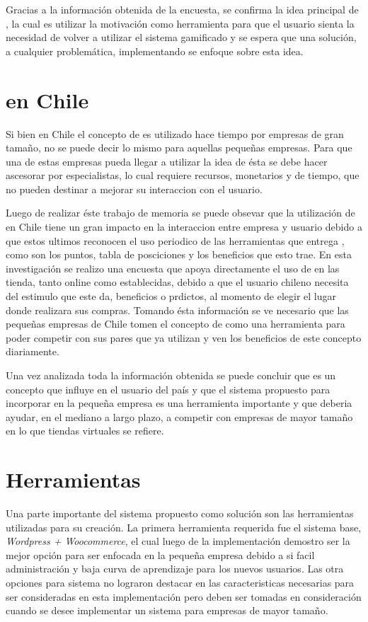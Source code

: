 Gracias a la información obtenida de la encuesta, se confirma la
idea principal de {\gam}, la cual es utilizar la motivación como herramienta para
que el usuario sienta la necesidad de volver a utilizar el sistema gamificado y
se espera que una solución, a cualquier problemática, implementando {\gam} se
enfoque sobre esta idea.

\section{{\GAM} en Chile}

Si bien en Chile el concepto de {\gam} es utilizado hace tiempo por empresas de gran tamaño, no se
puede decir lo mismo para aquellas pequeñas empresas. Para que una de estas empresas pueda
llegar a utilizar la idea de {\gam} ésta se debe hacer ascesorar por especialistas, lo cual 
requiere recursos, monetarios y de tiempo, que no pueden destinar a mejorar su interaccion con el usuario. 

Luego de realizar éste trabajo de memoria se puede obsevar que la utilización de {\gam} en Chile tiene 
un gran impacto en la interaccion entre empresa y usuario debido a que estos ultimos reconocen el uso
periodico de las herramientas que entrega {\gam}, como son los puntos, tabla de posciciones y los 
beneficios que esto trae. 
En esta investigación se realizo una encuesta que apoya directamente el uso de {\gam} en las tienda, tanto
online como establecidas, debido a que el usuario chileno necesita del estimulo que este da, beneficios o prdictos, 
al momento de elegir el lugar donde realizara sus compras. Tomando ésta información se ve necesario que las
pequeñas empresas de Chile tomen el concepto de {\gam} como una herramienta para poder competir con sus 
pares que ya utilizan {\gam} y ven los beneficios de este concepto diariamente.

Una vez analizada toda la información obtenida se puede concluir que {\gam} es un concepto que influye 
en el usuario del país y que el sistema propuesto para incorporar {\gam} en la pequeña empresa
es una herramienta importante y que deberia ayudar, en el mediano a largo plazo, a competir con empresas
de mayor tamaño en lo que tiendas virtuales se refiere. 

\section{Herramientas}

Una parte importante del sistema propuesto como solución son las herramientas utilizadas para su creación. 
La primera herramienta requerida fue el sistema base, \emph{Wordpress + Woocommerce}, el cual luego de 
la implementación demostro ser la mejor opción para ser enfocada en la pequeña empresa debido a si 
facil administración y baja curva de aprendizaje para los nuevos usuarios. Las otra opciones para sistema no lograron
destacar en las caracteristicas necesarias para ser consideradas en esta implementación pero deben ser
tomadas en consideración cuando se desee implementar un sistema para empresas de mayor tamaño.

